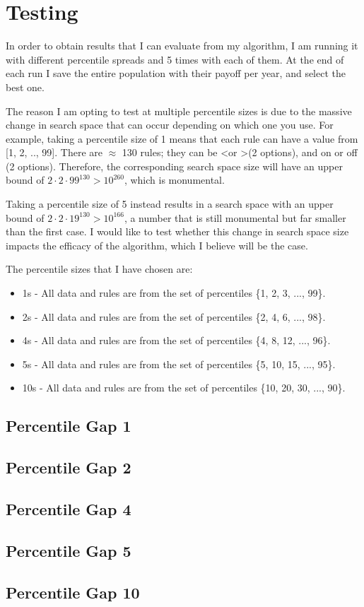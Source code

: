 \section{Testing}

In order to obtain results that I can evaluate from my algorithm, I am running it with different percentile spreads and 5 times with each of them. At the end of each run I save the entire population with their payoff per year, and select the best one. \newline

The reason I am opting to test at multiple percentile sizes is due to the massive change in search space that can occur depending on which one you use. For example, taking a percentile size of 1 means that each rule can have a value from [1, 2, .., 99]. There are $\approx$ 130 rules; they can be \textless or \textgreater (2 options), and on or off (2 options). Therefore, the corresponding search space size will have an upper bound of $2 \cdot 2 \cdot 99^{130} > 10^{260}$, which is monumental. \newline

Taking a percentile size of 5 instead results in a search space with an upper bound of $2 \cdot 2 \cdot19^{130} > 10^{166}$, a number that is still monumental but far smaller than the first case. I would like to test whether this change in search space size impacts the efficacy of the algorithm, which I believe will be the case. \newline

The percentile sizes that I have chosen are:
\begin{itemize}
    \item 1s - All data and rules are from the set of percentiles \{1, 2, 3, ..., 99\}.
    \item 2s - All data and rules are from the set of percentiles \{2, 4, 6, ..., 98\}.
    \item 4s - All data and rules are from the set of percentiles \{4, 8, 12, ..., 96\}.
    \item 5s - All data and rules are from the set of percentiles \{5, 10, 15, ..., 95\}.
    \item 10s - All data and rules are from the set of percentiles \{10, 20, 30, ..., 90\}.
\end{itemize}

\subsection{Percentile Gap 1}

\subsection{Percentile Gap 2}

\subsection{Percentile Gap 4}

\subsection{Percentile Gap 5}

\subsection{Percentile Gap 10}